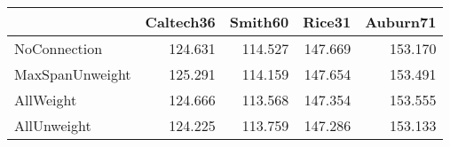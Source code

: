 \begin{tabular}{lrrrr}
\toprule
{} & Caltech36 & Smith60 &  Rice31 & Auburn71 \\
\midrule
NoConnection    &   124.631 & 114.527 & 147.669 &  153.170 \\
MaxSpanUnweight &   125.291 & 114.159 & 147.654 &  153.491 \\
AllWeight       &   124.666 & 113.568 & 147.354 &  153.555 \\
AllUnweight     &   124.225 & 113.759 & 147.286 &  153.133 \\
\bottomrule
\end{tabular}
